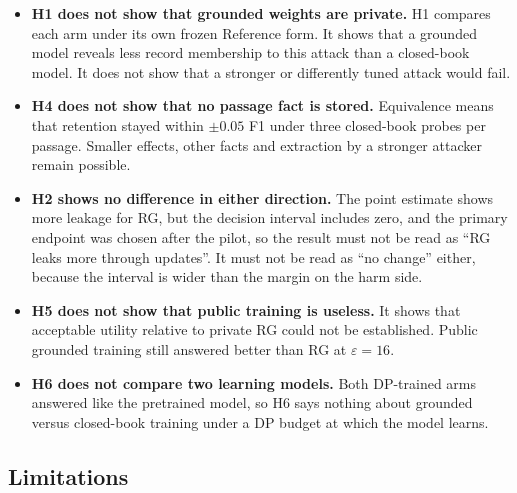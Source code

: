 \documentclass[11pt]{article}
\begin{document}
\begin{itemize}
  \item \textbf{H1 does not show that grounded weights are private.} H1 compares each arm under its own frozen Reference form. It shows that a grounded model reveals less record membership to this attack than a closed-book model. It does not show that a stronger or differently tuned attack would fail.
  \item \textbf{H4 does not show that no passage fact is stored.} Equivalence means that retention stayed within $\pm0.05$ F1 under three closed-book probes per passage. Smaller effects, other facts and extraction by a stronger attacker remain possible.
  \item \textbf{H2 shows no difference in either direction.} The point estimate shows more leakage for RG, but the decision interval includes zero, and the primary endpoint was chosen after the pilot, so the result must not be read as ``RG leaks more through updates''. It must not be read as ``no change'' either, because the interval is wider than the margin on the harm side.
  \item \textbf{H5 does not show that public training is useless.} It shows that acceptable utility relative to private RG could not be established. Public grounded training still answered better than RG at $\varepsilon=16$.
  \item \textbf{H6 does not compare two learning models.} Both DP-trained arms answered like the pretrained model, so H6 says nothing about grounded versus closed-book training under a DP budget at which the model learns.
\end{itemize}

\subsection{Limitations}\label{sec:scope}
\end{document}
